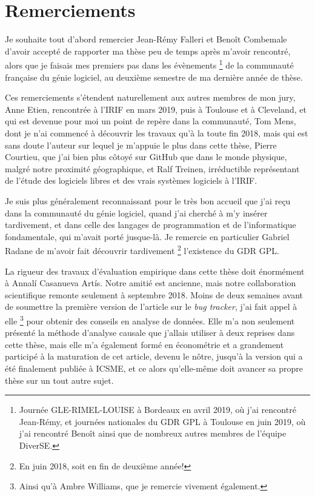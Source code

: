 \chapter*{Remerciements}

Je souhaite tout d'abord remercier Jean-R\'emy Falleri et Beno\^it Combemale d'avoir accept\'e de rapporter ma th\`ese peu de temps apr\`es m'avoir rencontr\'e, alors que je faisais mes premiers pas dans les \'ev\`enements%
\footnote{
    Journ\'ee GLE-RIMEL-LOUISE \`a Bordeaux en avril 2019, o\`u j'ai rencontr\'e Jean-R\'emy, et journ\'ees nationales du GDR GPL \`a Toulouse en juin 2019, o\`u j'ai rencontr\'e Beno\^it ainsi que de nombreux autres membres de l'\'equipe DiverSE.
}
de la communaut\'e fran\c{c}aise du g\'enie logiciel, au deuxi\`eme semestre de ma derni\`ere ann\'ee de th\`ese.

Ces remerciements s'\'etendent naturellement aux autres membres de mon jury, Anne Etien, rencontr\'ee \`a l'IRIF en mars 2019, puis \`a Toulouse et \`a Cleveland, et qui est devenue pour moi un point de rep\`ere dans la communaut\'e, Tom Mens, dont je n'ai commenc\'e \`a d\'ecouvrir les travaux qu'\`a la toute fin 2018, mais qui est sans doute l'auteur sur lequel je m'appuie le plus dans cette th\`ese, Pierre Courtieu, que j'ai bien plus c\^otoy\'e sur GitHub que dans le monde physique, malgr\'e notre proximit\'e g\'eographique, et Ralf Treinen, irr\'eductible repr\'esentant de l'\'etude des logiciels libres et des vrais syst\`emes logiciels \`a l'IRIF.

Je suis plus g\'en\'eralement reconnaissant pour le tr\`es bon accueil que j'ai re\c{c}u dans la communaut\'e du g\'enie logiciel, quand j'ai cherch\'e \`a m'y ins\'erer tardivement, et dans celle des langages de programmation et de l'informatique fondamentale, qui m'avait port\'e jusque-l\`a.
Je remercie en particulier Gabriel Radane de m'avoir fait d\'ecouvrir tardivement%
\footnote{
    En juin 2018, soit en fin de deuxi\`eme ann\'ee!
}
l'existence du GDR GPL.

La rigueur des travaux d'\'evaluation empirique dans cette th\`ese doit \'enorm\'ement \`a Annal\'i Casanueva Art\'is.
Notre amiti\'e est ancienne, mais notre collaboration scientifique remonte seulement \`a septembre 2018.
Moins de deux semaines avant de soumettre la premi\`ere version de l'article sur le \emph{bug tracker}, j'ai fait appel \`a elle%
\footnote{
    Ainsi qu'\`a Ambre Williams, que je remercie vivement \'egalement.
}
pour obtenir des conseils en analyse de donn\'ees.
Elle m'a non seulement pr\'esent\'e la m\'ethode d'analyse causale que j'allais utiliser \`a deux reprises dans cette th\`ese, mais elle m'a \'egalement form\'e en \'econom\'etrie et a grandement particip\'e \`a la maturation de cet article, devenu le n\^otre, jusqu'\`a la version qui a \'et\'e finalement publi\'ee \`a ICSME, et ce alors qu'elle-m\^eme doit avancer sa propre th\`ese sur un tout autre sujet.

